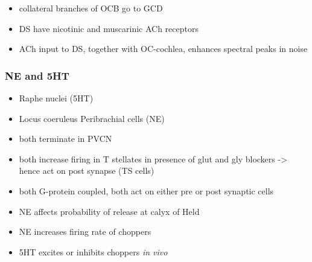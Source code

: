 \begin{itemize}
\item collateral branches of OCB go to GCD \citep{MellottMottsEtAl:2011,SherriffHenderson:1994,OsenRoth:1969}
\item DS have nicotinic and muscarinic ACh receptors \citep{FujinoOertel:2001}
\item ACh input to DS, together with OC-cochlea, enhances spectral peaks in noise  \citep{FujinoOertel:2001}
\end{itemize}

\subsubsection{NE and 5HT}

\begin{itemize}
\item Raphe nuclei (5HT)
\item Locus coeruleus Peribrachial cells (NE)
\item both terminate in PVCN \citep{KlepperHerbert:1991,Thompson:2003,ThompsonLauder:2005,Thompson:2003a,ThompsonWiechmann:2002,BehrensSchofieldEtAl:2002,ThompsonThompson:2001,ThompsonThompson:2001a,ThompsonMooreEtAl:1995,ThompsonThompsonEtAl:1994}
\item both increase firing in T stellates \citep{OertelWrightEtAl:2011} in presence of glut and gly blockers -> hence act on post synapse (TS cells)
\item both G-protein coupled, both act on either pre or post synaptic cells
\item NE affects probability of release at calyx of Held
\item NE increases firing rate of choppers \citep{KosslVater:1989,Ebert:1996}
\item 5HT excites or inhibits choppers \emph{in vivo} \citep{EbertOstwald:1992}
\end{itemize}





